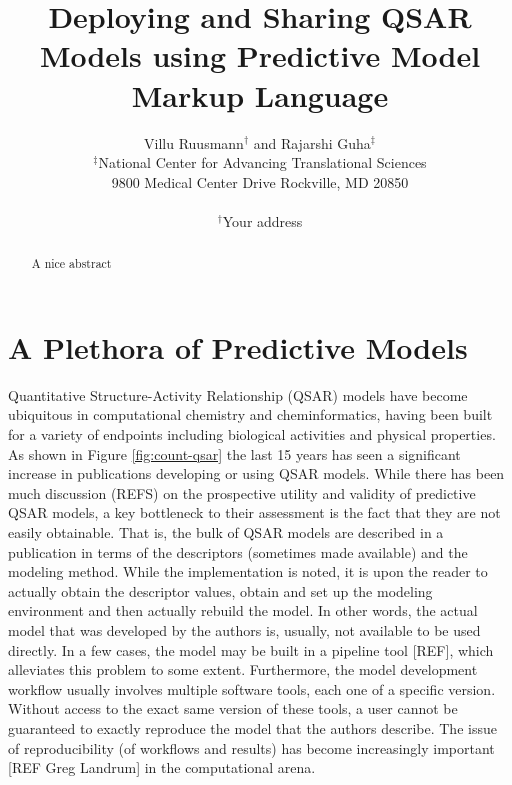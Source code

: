 \documentclass[12pt,letterpaper]{article}
\begin{document}
\title{Deploying and Sharing QSAR Models using Predictive Model Markup Language}
\author{Villu Ruusmann${}^{\dagger}$ and Rajarshi Guha${}^{\ddagger}$\\
${}^{\ddagger}$National Center for Advancing Translational Sciences\\ 9800 Medical Center Drive  Rockville, MD 20850 \\ \\
${}^{\dagger}$Your address }
\date{}
\maketitle
\begin{abstract}
  A nice abstract
\end{abstract}

\section{A Plethora of Predictive Models}
\label{sec:introduction}

Quantitative Structure-Activity Relationship (QSAR) models have become
ubiquitous in computational chemistry and cheminformatics, having been
built for a variety of endpoints including biological activities and
physical properties. As shown in Figure \ref{fig:count-qsar} the last
15 years has seen a significant increase in publications developing or
using QSAR models. While there has been much discussion (REFS) on the
prospective utility and validity of predictive QSAR models, a key
bottleneck to their assessment is the fact that they are not easily
obtainable. That is, the bulk of QSAR models are described in a
publication in terms of the descriptors (sometimes made available) and
the modeling method. While the implementation is noted, it is upon the
reader to actually obtain the descriptor values, obtain and set up the
modeling environment and then actually rebuild the model. In other
words, the actual model that was developed by the authors is, usually,
not available to be used directly. In a few cases, the model may be
built in a pipeline tool [REF], which alleviates this problem to some
extent. Furthermore, the model development workflow usually involves
multiple software tools, each one of a specific version. Without
access to the exact same version of these tools, a user cannot be
guaranteed to exactly reproduce the model that the authors
describe. The issue of reproducibility (of workflows and results) has
become increasingly important [REF Greg Landrum] in the computational
arena.
\end{document}
